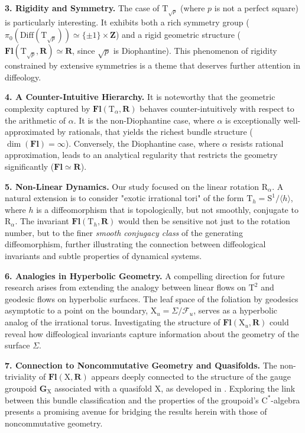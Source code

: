 \documentclass[10pt,letterpaper,reqno]{amsart}
\theoremstyle{article}
\newcommand{\1}{{\hat 1}}
\newcommand{\0}{{\hat 0}}
\newcommand{\GG}{{\mathbf G}}
\newcommand{\RR}{\mathbf R}
\newcommand{\ZZ}{\mathbf Z}
\def \R{\mathrm R}
\def \S{\mathrm S}
\def \T{\mathrm T}
\def \X{\mathrm X}
\newcommand{\Diff}{\mathrm{Diff}}
\DeclareMathOperator{\Fb}{\boldsymbol{\mathsf{Fl}}}
\renewcommand{\Fb}{\mathbf{Fl}}
\begin{document}
    \textbf{3. Rigidity and Symmetry.} The case of $\T_{\sqrt{p}}$ (where $p$ is not a perfect square) is particularly interesting. It exhibits both a rich symmetry group ($\pi_0(\Diff(\T_{\sqrt{p}})) \simeq \{\pm 1\} \times \ZZ$) and a rigid geometric structure ($\Fb(\T_{\sqrt{p}},\RR) \simeq \RR$, since $\sqrt{p}$ is Diophantine). This phenomenon of rigidity constrained by extensive symmetries is a theme that deserves further attention in diffeology.
    
    \textbf{4. A Counter-Intuitive Hierarchy.} It is noteworthy that the geometric complexity captured by $\Fb(\T_\alpha, \RR)$ behaves counter-intuitively with respect to the arithmetic of $\alpha$. It is the non-Diophantine case, where $\alpha$ is exceptionally well-approximated by rationals, that yields the richest bundle structure ($\dim(\Fb)=\infty$). Conversely, the Diophantine case, where $\alpha$ resists rational approximation, leads to an analytical regularity that restricts the geometry significantly ($\Fb \simeq \RR$).
    
    \textbf{5. Non-Linear Dynamics.} Our study focused on the linear rotation $\R_\alpha$. A natural extension is to consider "exotic irrational tori" of the form $\T_h = \S^1 / \langle h \rangle$, where $h$ is a diffeomorphism that is topologically, but not smoothly, conjugate to $\R_\alpha$. The invariant $\Fb(\T_h, \RR)$ would then be sensitive not just to the rotation number, but to the finer \emph{smooth conjugacy class} of the generating diffeomorphism, further illustrating the connection between diffeological invariants and subtle properties of dynamical systems.
    
    \textbf{6. Analogies in Hyperbolic Geometry.} A compelling direction for future research arises from extending the analogy between linear flows on $\T^2$ and geodesic flows on hyperbolic surfaces. The leaf space of the foliation by geodesics asymptotic to a point on the boundary, $\X_u = \Sigma/\mathcal{F}_u$, serves as a hyperbolic analog of the irrational torus. Investigating the structure of $\Fb(\X_u, \RR)$ could reveal how diffeological invariants capture information about the geometry of the surface $\Sigma$.
    
    \textbf{7. Connection to Noncommutative Geometry and Quasifolds.} The non-triviality of $\Fb(\X, \RR)$ appears deeply connected to the structure of the gauge groupoid $\GG_\X$ associated with a quasifold $\X$, as developed in \cite{IZP21}. Exploring the link between this bundle classification and the properties of the groupoid's $\mathrm{C}^*$-algebra presents a promising avenue for bridging the results herein with those of noncommutative geometry.
    
\end{document}
